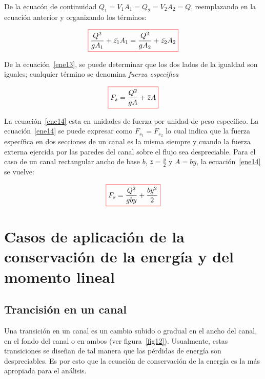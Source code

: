 \documentclass[11pt, oneside]{article}
\begin{document}
De la ecuac\'on de continuidad $Q_1 = V_1 A_1 = Q_2 = V_2 A_2 = Q$, reemplazando en la ecuaci\'on anterior y organizando los t\'erminos:

\begin{equation}
\color{red}\boxed{\color{black}\frac{Q^2}{g A_1} + \bar{z_1}A_1 = \frac{Q^2}{g A_2} + \bar{z_2}A_2 }
\label{ene13}
\end{equation}

De la ecuaci\'on~\ref{ene13}, se puede determinar que los dos lados de la igualdad son iguales; cualquier t\'ermino se denomina \emph{fuerza especifica}

\begin{equation}
\color{red}\boxed{\color{black} F_s = \frac{Q^2}{g A} + \bar{z}A  }
\label{ene14}
\end{equation}

La ecuaci\'on~\ref{ene14} esta en unidades de fuerza por unidad de peso espec\'ifico. La ecuaci\'on~\ref{ene14} se puede expresar como $F_{s_1} = F_{s_2}$ lo cual indica que la fuerza espec\'ifica en dos secciones de un canal es la misma siempre y cuando la fuerza externa ejercida por las paredes del canal sobre el flujo sea despreciable. Para el caso de un canal rectangular ancho de base $b$, $\bar{z} = \frac{y}{2}$ y $A=by$, la ecuaci\'on~\ref{ene14} se vuelve:

\begin{equation}
\color{red}\boxed{\color{black} F_s = \frac{Q^2}{g by} + \frac{by^2}{2} }
\label{ene15}
\end{equation}

\section{Casos de aplicaci\'on de la conservaci\'on de la energ\'ia y del momento lineal}
\subsection{Trancisi\'on en un canal}
Una transici\'on en un canal es un cambio subido o gradual en el ancho del canal, en el fondo del canal o en ambos (ver figura~\ref{fig12}). Usualmente, estas transiciones se diseñan de tal manera que las p\'erdidas de energ\'ia son despreciables. Es por esto que la ecuaci\'on de conservaci\'on de la energ\'ia es la m\'as apropiada para el an\'alisis. 
\end{document}

